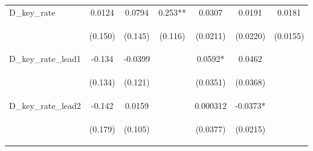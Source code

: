 \documentclass[]{article}
\begin{document}
\begin{center}
\begin{tabular}{lcccccc}
D\_key\_rate & 0.0124 & 0.0794 & 0.253** & 0.0307 & 0.0191 & 0.0181 \\
\vspace{4pt} & \begin{footnotesize}(0.150)\end{footnotesize} & \begin{footnotesize}(0.145)\end{footnotesize} & \begin{footnotesize}(0.116)\end{footnotesize} & \begin{footnotesize}(0.0211)\end{footnotesize} & \begin{footnotesize}(0.0220)\end{footnotesize} & \begin{footnotesize}(0.0155)\end{footnotesize} \\
D\_key\_rate\_lead1 & -0.134 & -0.0399 &  & 0.0592* & 0.0462 &  \\
\vspace{4pt} & \begin{footnotesize}(0.134)\end{footnotesize} & \begin{footnotesize}(0.121)\end{footnotesize} & \begin{footnotesize}\end{footnotesize} & \begin{footnotesize}(0.0351)\end{footnotesize} & \begin{footnotesize}(0.0368)\end{footnotesize} & \begin{footnotesize}\end{footnotesize} \\
D\_key\_rate\_lead2 & -0.142 & 0.0159 &  & 0.000312 & -0.0373* &  \\
\vspace{4pt} & \begin{footnotesize}(0.179)\end{footnotesize} & \begin{footnotesize}(0.105)\end{footnotesize} & \begin{footnotesize}\end{footnotesize} & \begin{footnotesize}(0.0377)\end{footnotesize} & \begin{footnotesize}(0.0215)\end{footnotesize} & \begin{footnotesize}\end{footnotesize} \\

\end{tabular}
\end{center}
\end{document}
